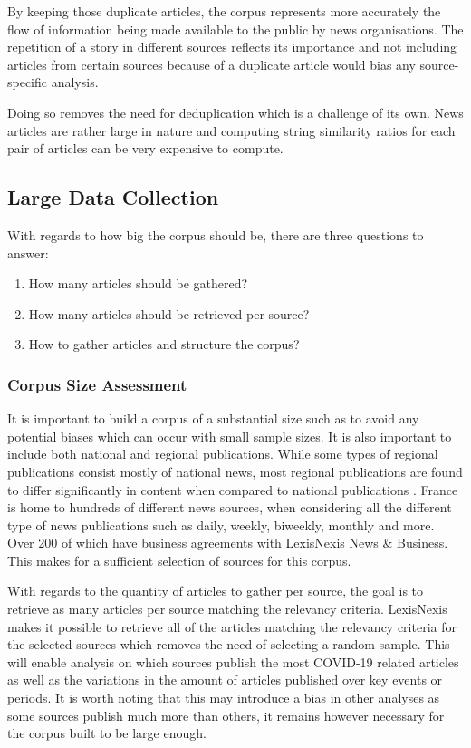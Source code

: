 By keeping those duplicate articles, the corpus represents more accurately the flow of information being made available to the public by news organisations. The repetition of a story in different sources reflects its importance and not including articles from certain sources because of a duplicate article would bias any source-specific analysis.

Doing so removes the need for deduplication which is a challenge of its own. News articles are rather large in nature and computing string similarity ratios for each pair of articles can be very expensive to compute.

\subsection{Large Data Collection}\label{Data Collection}

With regards to how big the corpus should be, there are three questions to answer:
\begin{enumerate}
    \item How many articles should be gathered?
    \item How many articles should be retrieved per source?
    \item How to gather articles and structure the corpus?
\end{enumerate}

\subsubsection{Corpus Size Assessment}

It is important to build a corpus of a substantial size such as to avoid any potential biases which can occur with small sample sizes. It is also important to include both national and regional publications. While some types of regional publications consist mostly of national news, most regional publications are found to differ significantly in content when compared to national publications \citep{ballarini2008presse}. France is home to hundreds of different news sources, when considering all the different type of news publications such as daily, weekly, biweekly, monthly and more. Over 200 of which have business agreements with LexisNexis News \& Business. This makes for a sufficient selection of sources for this corpus.

With regards to the quantity of articles to gather per source, the goal is to retrieve as many articles per source matching the relevancy criteria. LexisNexis makes it possible to retrieve all of the articles matching the relevancy criteria for the selected sources which removes the need of selecting a random sample. This will enable analysis on which sources publish the most COVID-19 related articles as well as the variations in the amount of articles published over key events or periods. It is worth noting that this may introduce a bias in other analyses as some sources publish much more than others, it remains however necessary for the corpus built to be large enough.

